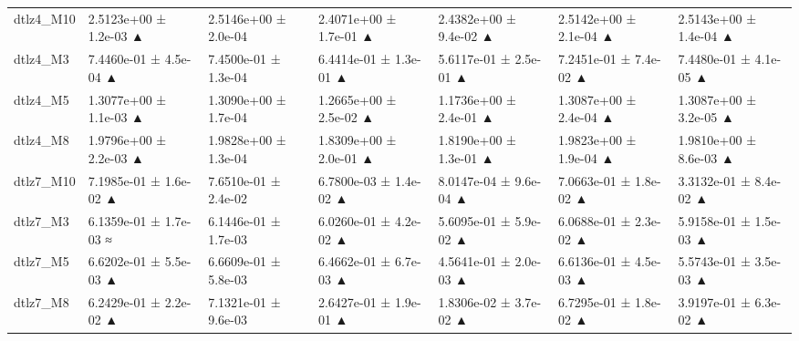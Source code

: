 \begin{tabular}{lllllll}
dtlz4\_M10 & 2.5123e+00 ± 1.2e-03 ▲ & 2.5146e+00 ± 2.0e-04 & 2.4071e+00 ± 1.7e-01 ▲ & 2.4382e+00 ± 9.4e-02 ▲ & 2.5142e+00 ± 2.1e-04 ▲ & 2.5143e+00 ± 1.4e-04 ▲ \\
dtlz4\_M3 & 7.4460e-01 ± 4.5e-04 ▲ & 7.4500e-01 ± 1.3e-04 & 6.4414e-01 ± 1.3e-01 ▲ & 5.6117e-01 ± 2.5e-01 ▲ & 7.2451e-01 ± 7.4e-02 ▲ & 7.4480e-01 ± 4.1e-05 ▲ \\
dtlz4\_M5 & 1.3077e+00 ± 1.1e-03 ▲ & 1.3090e+00 ± 1.7e-04 & 1.2665e+00 ± 2.5e-02 ▲ & 1.1736e+00 ± 2.4e-01 ▲ & 1.3087e+00 ± 2.4e-04 ▲ & 1.3087e+00 ± 3.2e-05 ▲ \\
dtlz4\_M8 & 1.9796e+00 ± 2.2e-03 ▲ & 1.9828e+00 ± 1.3e-04 & 1.8309e+00 ± 2.0e-01 ▲ & 1.8190e+00 ± 1.3e-01 ▲ & 1.9823e+00 ± 1.9e-04 ▲ & 1.9810e+00 ± 8.6e-03 ▲ \\
dtlz7\_M10 & 7.1985e-01 ± 1.6e-02 ▲ & 7.6510e-01 ± 2.4e-02 & 6.7800e-03 ± 1.4e-02 ▲ & 8.0147e-04 ± 9.6e-04 ▲ & 7.0663e-01 ± 1.8e-02 ▲ & 3.3132e-01 ± 8.4e-02 ▲ \\
dtlz7\_M3 & 6.1359e-01 ± 1.7e-03 ≈ & 6.1446e-01 ± 1.7e-03 & 6.0260e-01 ± 4.2e-02 ▲ & 5.6095e-01 ± 5.9e-02 ▲ & 6.0688e-01 ± 2.3e-02 ▲ & 5.9158e-01 ± 1.5e-03 ▲ \\
dtlz7\_M5 & 6.6202e-01 ± 5.5e-03 ▲ & 6.6609e-01 ± 5.8e-03 & 6.4662e-01 ± 6.7e-03 ▲ & 4.5641e-01 ± 2.0e-03 ▲ & 6.6136e-01 ± 4.5e-03 ▲ & 5.5743e-01 ± 3.5e-03 ▲ \\
dtlz7\_M8 & 6.2429e-01 ± 2.2e-02 ▲ & 7.1321e-01 ± 9.6e-03 & 2.6427e-01 ± 1.9e-01 ▲ & 1.8306e-02 ± 3.7e-02 ▲ & 6.7295e-01 ± 1.8e-02 ▲ & 3.9197e-01 ± 6.3e-02 ▲ \\
\bottomrule
\end{tabular}
